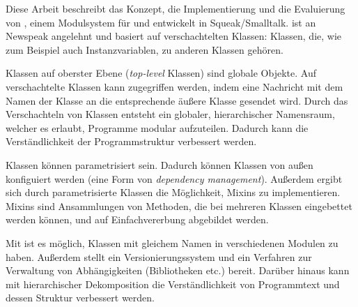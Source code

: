 \begin{zusammenfassung}
Diese Arbeit beschreibt das Konzept, die Implementierung und die Evaluierung von \msname, einem Modulsystem für und entwickelt in Squeak/Smalltalk. \msname ist an Newspeak angelehnt und basiert auf verschachtelten Klassen: Klassen, die, wie zum Beispiel auch Instanzvariablen, zu anderen Klassen gehören.

Klassen auf oberster Ebene (\emph{top-level} Klassen) sind globale Objekte. Auf verschachtelte Klassen kann zugegriffen werden, indem eine Nachricht mit dem Namen der Klasse an die entsprechende äußere Klasse gesendet wird. Durch das Verschachteln von Klassen entsteht ein globaler, hierarchischer Namensraum, welcher es erlaubt, Programme modular aufzuteilen. Dadurch kann die Verständlichkeit der Programmstruktur verbessert werden.

Klassen können parametrisiert sein. Dadurch können Klassen von außen konfiguiert werden (eine Form von \emph{dependency management}). Außerdem ergibt sich durch parametrisierte Klassen die Möglichkeit, Mixins zu implementieren. Mixins sind Ansammlungen von Methoden, die bei mehreren Klassen eingebettet werden können, und auf Einfachvererbung abgebildet werden. 

Mit \msname ist es möglich, Klassen mit gleichem Namen in verschiedenen Modulen zu haben. Außerdem stellt \msname ein Versionierungssystem und ein Verfahren zur Verwaltung  von Abhängigkeiten (Bibliotheken etc.) bereit. Darüber hinaus kann mit hierarchischer Dekomposition die Verständlichkeit von Programmtext und dessen Struktur verbessert werden.
\end{zusammenfassung}

